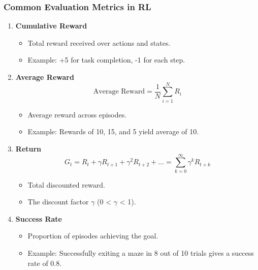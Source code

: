 \documentclass{beamer}
\begin{document}
\begin{frame}[fragile]
    \frametitle{Common Evaluation Metrics in RL}
    \begin{enumerate}
        \item \textbf{Cumulative Reward}
        \begin{itemize}
            \item Total reward received over actions and states.
            \item Example: +5 for task completion, -1 for each step.
        \end{itemize}

        \item \textbf{Average Reward}
        \begin{equation}
            \text{Average Reward} = \frac{1}{N} \sum_{i=1}^N R_i
        \end{equation}
        \begin{itemize}
            \item Average reward across episodes.
            \item Example: Rewards of 10, 15, and 5 yield average of 10.
        \end{itemize}

        \item \textbf{Return}
        \begin{equation}
            G_t = R_t + \gamma R_{t+1} + \gamma^2 R_{t+2} + \ldots = \sum_{k=0}^{\infty} \gamma^k R_{t+k}
        \end{equation}
        \begin{itemize}
            \item Total discounted reward.
            \item The discount factor $\gamma$ (0 < $\gamma$ < 1).
        \end{itemize}
        
        \item \textbf{Success Rate}
        \begin{itemize}
            \item Proportion of episodes achieving the goal.
            \item Example: Successfully exiting a maze in 8 out of 10 trials gives a success rate of 0.8.
        \end{itemize}
    \end{enumerate}
\end{frame}
\end{document}
